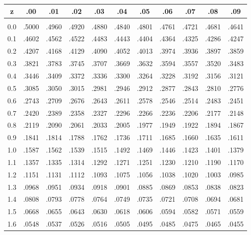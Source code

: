 \documentclass[12pt,a4paper]{article}
\makeatletter
\renewenvironment{table}[1][]{%
 \ifthenelse{\equal{#1}{}}{%
   \@float{table}
 }{%
   \@float{table}[#1]%
 }%
 \centering
}{%
 \end@float
}
\makeatother
\begin{document}
\FloatBarrier
\begin{table}[!htbp] 
\centering 
\fontsize{9pt}{9pt}\selectfont
\begin{tabularx}{\textwidth}{ c|CCCCCCCCCC}
z     & .00 &  .01 &  .02 &  .03 &  .04 &  .05 &  .06 &  .07 &  .08 &  .09 \\\hline
                &&&&&&&&&&  \\[-1.2ex]
0.0 & .5000 &  .4960 &  .4920 &  .4880 &  .4840 &  .4801 &  .4761 &  .4721 &  .4681 &  .4641 \\
0.1 & .4602 &  .4562 &  .4522 &  .4483 &  .4443 &  .4404 &  .4364 &  .4325 &  .4286 &  .4247 \\
0.2 & .4207 &  .4168 &  .4129 &  .4090 &  .4052 &  .4013 &  .3974 &  .3936 &  .3897 &  .3859 \\
0.3 & .3821 &  .3783 &  .3745 &  .3707 &  .3669 &  .3632 &  .3594 &  .3557 &  .3520 &  .3483 \\
0.4 & .3446 &  .3409 &  .3372 &  .3336 &  .3300 &  .3264 &  .3228 &  .3192 &  .3156 &  .3121 \\
0.5 & .3085 &  .3050 &  .3015 &  .2981 &  .2946 &  .2912 &  .2877 &  .2843 &  .2810 &  .2776 \\
0.6 & .2743 &  .2709 &  .2676 &  .2643 &  .2611 &  .2578 &  .2546 &  .2514 &  .2483 &  .2451 \\
0.7 & .2420 &  .2389 &  .2358 &  .2327 &  .2296 &  .2266 &  .2236 &  .2206 &  .2177 &  .2148 \\
0.8 & .2119 &  .2090 &  .2061 &  .2033 &  .2005 &  .1977 &  .1949 &  .1922 &  .1894 &  .1867 \\
0.9 & .1841 &  .1814 &  .1788 &  .1762 &  .1736 &  .1711 &  .1685 &  .1660 &  .1635 &  .1611 \\
1.0 & .1587 &  .1562 &  .1539 &  .1515 &  .1492 &  .1469 &  .1446 &  .1423 &  .1401 &  .1379 \\
1.1 & .1357 &  .1335 &  .1314 &  .1292 &  .1271 &  .1251 &  .1230 &  .1210 &  .1190 &  .1170 \\
1.2 & .1151 &  .1131 &  .1112 &  .1093 &  .1075 &  .1056 &  .1038 &  .1020 &  .1003 &  .0985 \\
1.3 & .0968 &  .0951 &  .0934 &  .0918 &  .0901 &  .0885 &  .0869 &  .0853 &  .0838 &  .0823 \\
1.4 & .0808 &  .0793 &  .0778 &  .0764 &  .0749 &  .0735 &  .0721 &  .0708 &  .0694 &  .0681 \\
1.5 & .0668 &  .0655 &  .0643 &  .0630 &  .0618 &  .0606 &  .0594 &  .0582 &  .0571 &  .0559 \\
1.6 & .0548 &  .0537 &  .0526 &  .0516 &  .0505 &  .0495 &  .0485 &  .0475 &  .0465 &  .0455 \\

\end{tabularx}
\end{table}
\end{document}
